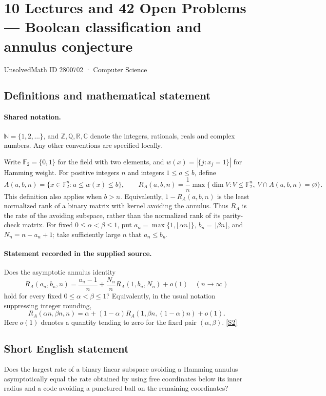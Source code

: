 \documentclass[11pt]{article}
\newcommand{\sref}[2]{\hyperlink{source:#1:#2}{[S#2]}}
\begin{document}
\setcounter{section}{2800701}
\section{10 Lectures and 42 Open Problems — Boolean classification and annulus conjecture}\label{2800702}
{\small\sffamily UnsolvedMath ID 2800702 · Computer Science}
\subsection{Definitions and mathematical statement}

\paragraph{Shared notation.}$\mathbb N=\{1,2,\ldots\}$, and $\mathbb Z,\mathbb Q,\mathbb R,\mathbb C$ denote the integers, rationals, reals and complex numbers. Any other conventions are specified locally.


Write \(\mathbb F_2=\{0,1\}\) for the field with two elements, and \(w(x)=|\{j:x_j=1\}|\) for Hamming weight. For positive integers \(n\) and integers \(1\le a\le b\), define
\[A(a,b,n)=\{x\in\mathbb F_2^n:a\le w(x)\le b\},\qquad
R_A(a,b,n)=\frac1n\max\{\dim V:V\le\mathbb F_2^n,\ V\cap A(a,b,n)=\varnothing\}.\]
This definition also applies when \(b>n\). Equivalently, \(1-R_A(a,b,n)\) is the least normalized rank of a binary matrix with kernel avoiding the annulus. Thus \(R_A\) is the rate of the avoiding subspace, rather than the normalized rank of its parity-check matrix.
For fixed \(0\le\alpha<\beta\le1\), put \(a_n=\max\{1,\lfloor\alpha n\rfloor\}\), \(b_n=\lfloor\beta n\rfloor\), and \(N_n=n-a_n+1\); take sufficiently large \(n\) that \(a_n\le b_n\).
\paragraph{Statement recorded in the supplied source.}
Does the asymptotic annulus identity
\[R_A(a_n,b_n,n)=\frac{a_n-1}{n}+\frac{N_n}{n}R_A(1,b_n,N_n)+o(1)\quad(n\to\infty)\]
hold for every fixed \(0\le\alpha<\beta\le1\)? Equivalently, in the usual notation suppressing integer rounding,
\[R_A(\alpha n,\beta n,n)=\alpha+(1-\alpha)R_A(1,\beta n,(1-\alpha)n)+o(1).\]
Here \(o(1)\) denotes a quantity tending to zero for the fixed pair \((\alpha,\beta)\). \sref{2800702}{2}
\subsection{Short English statement}
Does the largest rate of a binary linear subspace avoiding a Hamming annulus asymptotically equal the rate obtained by using free coordinates below its inner radius and a code avoiding a punctured ball on the remaining coordinates?
\end{document}
